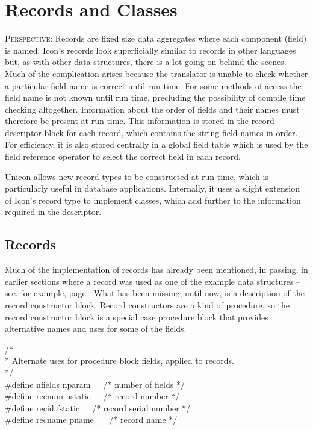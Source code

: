 \chapter{Records and Classes}
\label{RC-Chapter}

\textsc{Perspective}: Records are fixed size data aggregates where each
component (field) is named. Icon's records look superficially similar to
records in other languages but, as with other data structures, there is a
lot going on behind the scenes. Much of the complication arises because the
translator is unable to check whether a particular field name is correct
until run time. For some methods of access the field name is not known until
run time, precluding the possibility of compile time checking
altogether. Information about the order of fields and their names must
therefore be present at run time.  This information is stored in the record
descriptor block for each record, which contains the string field names in
order. For efficiency, it is also stored centrally in a global field table
which is used by the field reference operator to select the correct field in
each record.

Unicon allows new record types to be constructed at run time, which is
particularly useful in database applications. Internally, it uses a slight
extension of Icon's record type to implement classes, which add further to
the information required in the descriptor.

\section{Records}
Much of the implementation of records has already been mentioned, in
passing, in earlier sections where a record was used as one of the example
data structures -- see, for example, page \pageref{ComplexRecord}. What has
been missing, until now, is a description of the record constructor
block. Record constructors are a kind of procedure, so the record
constructor block is a special case procedure block that provides
alternative names and uses for some of the fields.

\begin{iconcode}
/*\\
 * Alternate uses for procedure block fields, applied to records.\\
 */\\
\#define nfields nparam\ \ \  /* number of fields */\\
\#define recnum  nstatic\ \ \ /* record number */\\
\#define recid   fstatic\ \ \ /* record serial number */\\
\#define recname pname \ \ \  /* record name */\\
\end{iconcode}

